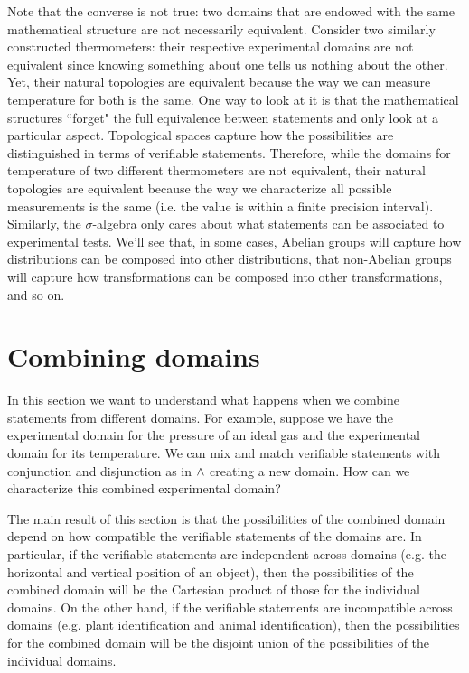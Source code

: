 Note that the converse is not true: two domains that are endowed with the same mathematical structure are not necessarily equivalent. Consider two similarly constructed thermometers: their respective experimental domains are not equivalent since knowing something about one tells us nothing about the other. Yet, their natural topologies are equivalent because the way we can measure temperature for both is the same. One way to look at it is that the mathematical structures ``forget" the full equivalence between statements and only look at a particular aspect. Topological spaces capture how the possibilities are distinguished in terms of verifiable statements. Therefore, while the domains for temperature of two different thermometers are not equivalent, their natural topologies are equivalent because the way we characterize all possible measurements is the same (i.e. the value is within a finite precision interval). Similarly, the $\sigma$-algebra only cares about what statements can be associated to experimental tests. We'll see that, in some cases, Abelian groups will capture how distributions can be composed into other distributions, that non-Abelian groups will capture how transformations can be composed into other transformations, and so on.

\section{Combining domains}

In this section we want to understand what happens when we combine statements from different domains. For example, suppose we have the experimental domain for the pressure of an ideal gas and the experimental domain for its temperature. We can mix and match verifiable statements with conjunction and disjunction as in $\wedge$ creating a new domain. How can we characterize this combined experimental domain?

The main result of this section is that the possibilities of the combined domain depend on how compatible the verifiable statements of the domains are. In particular, if the verifiable statements are independent across domains (e.g. the horizontal and vertical position of an object), then the possibilities of the combined domain will be the Cartesian product of those for the individual domains. On the other hand, if the verifiable statements are incompatible across domains (e.g. plant identification and animal identification), then the possibilities for the combined domain will be the disjoint union of the possibilities of the individual domains.

